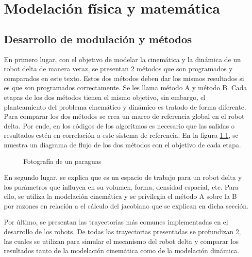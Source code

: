 \chapter{Modelación física y matemática}\label{CAP4}
    
\section{Desarrollo de modulación y métodos}
    En primero lugar, con el objetivo de modelar la cinemática y la dinámica de un robot delta de manera veraz, se presentan 2 métodos que son programados y comparados en este texto. Estos dos métodos deben dar los mismos resultados si es que son programados correctamente. Se les llama método A y método B. Cada etapas de los dos métodos tienen el mismo objetivo, sin embargo, el planteamiento del problema cinemático y dinámico es tratado de forma diferente. Para comparar los dos métodos se crea un marco de referencia global en el robot delta. Por ende, en los códigos de los algoritmos es necesario que las salidas o resultados estén en correlación a este sistema de referencia. En la figura \ref{f:Cap4_metodologia}, se muestra un diagrama de flujo de los dos métodos con el objetivo de cada etapa.
    
    
\begin{figure}[htb]
    \centering
    \caption{Fotografía de un paraguas}
    \label{f:Cap4_metodologia}
\end{figure}

    En segundo lugar, se explica que es un espacio de trabajo para un robot delta y los parámetros que influyen en su volumen, forma, densidad espacial, etc. Para ello, se utiliza la modelación cinemática y se privilegia el método A sobre la B por razones en relación a el cálculo del jacobiano que se explican en dicha sección.
    
    Por último, se presentan las trayectorias más comunes implementadas en el desarrollo de los robots. De todas las trayectorias presentadas se profundizan 2, las cuales se utilizan para simular el mecanismo del robot delta y comparar los resultados tanto de la modelación cinemática como de la modelación dinámica.
    
